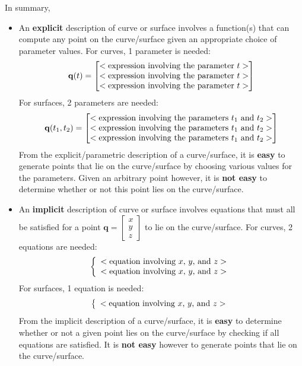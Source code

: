 \documentclass{article}
\begin{document}
In summary, 
\begin{itemize}
\item An {\bf explicit} description of curve or surface involves a function(s) that can compute any point on the curve/surface given an appropriate choice of parameter values. For curves, 1 parameter is needed:
\[\mathbf{q}(t) = \begin{bmatrix} <\textnormal{expression involving the parameter \(t\)}> \\ <\textnormal{expression involving the parameter \(t\)}> \\ <\textnormal{expression involving the parameter \(t\)}> \end{bmatrix}\] 
For surfaces, 2 parameters are needed:
\[\mathbf{q}(t_1, t_2) = \begin{bmatrix} <\textnormal{expression involving the parameters \(t_1\) and \(t_2\)}> \\ <\textnormal{expression involving the parameters \(t_1\) and \(t_2\)}> \\ <\textnormal{expression involving the parameters \(t_1\) and \(t_2\)}> \end{bmatrix}\] 
From the explicit/parametric description of a curve/surface, it is {\bf easy} to generate points that lie on the curve/surface by choosing various values for the parameters. Given an arbitrary point however, it is {\bf not easy} to determine whether or not this point lies on the curve/surface.
\item An {\bf implicit} description of curve or surface involves equations that must all be satisfied for a point \(\mathbf{q} = \begin{bmatrix} x \\ y \\ z \end{bmatrix}\) to lie on the curve/surface. For curves, 2 equations are needed:
\[\left\{\begin{array}{c} <\textnormal{equation involving \(x\), \(y\), and \(z\)}> \\ <\textnormal{equation involving \(x\), \(y\), and \(z\)}> \end{array}\right.\]  
For surfaces, 1 equation is needed:
\[\left\{\begin{array}{c} <\textnormal{equation involving \(x\), \(y\), and \(z\)}> \end{array}\right.\]
From the implicit description of a curve/surface, it is {\bf easy} to determine whether or not a given point lies on the curve/surface by checking if all equations are satisfied. It is {\bf not easy} however to generate points that lie on the curve/surface. 
\end{itemize}
\end{document}
